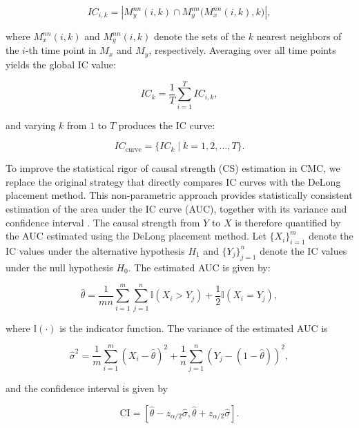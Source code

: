 \documentclass[authoryear,preprint,review,12pt]{elsarticle}
\begin{document}
\begin{equation}\label{eq_cmc_ic_ik_delong}
IC_{i,k} = \left| M_y^{nn}(i,k) \cap M_y^{nn}\big(M_x^{nn}(i,k),k\big) \right|,
\end{equation}

\noindent where $M_x^{nn}(i,k)$ and $M_y^{nn}(i,k)$ denote the sets of the $k$ nearest neighbors of the $i$-th time point in $M_x$ and $M_y$, respectively. Averaging over all time points yields the global IC value:

\begin{equation}\label{eq_cmc_ic_k_delong}
IC_k = \frac{1}{T} \sum_{i=1}^T IC_{i,k},
\end{equation}

\noindent and varying $k$ from $1$ to $T$ produces the IC curve:

\begin{equation}\label{eq_cmc_ic_curve_delong}
IC_{\text{curve}} = \{ IC_k \mid k = 1, 2, \dots, T \}.
\end{equation}

To improve the statistical rigor of causal strength (CS) estimation in CMC, we replace the original strategy that directly compares IC curves with the DeLong placement method. This non-parametric approach provides statistically consistent estimation of the area under the IC curve (AUC), together with its variance and confidence interval \citep{delong1988,sun2014delongfi}. The causal strength from $Y$ to $X$ is therefore quantified by the AUC estimated using the DeLong placement method. Let $\{X_i\}_{i=1}^{m}$ denote the IC values under the alternative hypothesis $H_1$ and $\{Y_j\}_{j=1}^{n}$ denote the IC values under the null hypothesis $H_0$. The estimated AUC is given by:

\begin{equation}
\hat{\theta} = \frac{1}{mn} \sum_{i=1}^{m} \sum_{j=1}^{n} \mathbb{I}(X_i > Y_j) + \frac{1}{2} \mathbb{I}(X_i = Y_j),
\end{equation}

\noindent where $\mathbb{I}(\cdot)$ is the indicator function. The variance of the estimated AUC is

\begin{equation}
\hat{\sigma}^2 = \frac{1}{m} \sum_{i=1}^{m} (X_i - \hat{\theta})^2 + \frac{1}{n} \sum_{j=1}^{n} (Y_j - (1 - \hat{\theta}))^2,
\end{equation}

\noindent and the confidence interval is given by

\begin{equation}
\text{CI} = \left[ \hat{\theta} - z_{\alpha/2} \hat{\sigma}, \hat{\theta} + z_{\alpha/2} \hat{\sigma} \right].
\end{equation}
\end{document}
